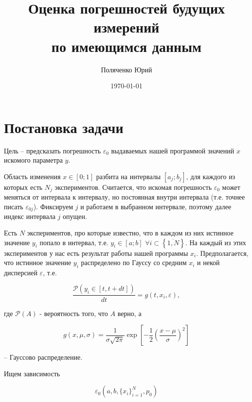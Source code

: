 \documentclass[a4paper,12pt]{article} %
\author{Поляченко Юрий}
\title{Оценка погрешностей будущих измерений \\ по имеющимся данным}
\date{\today}
\begin{document}

\clearpage\maketitle
\thispagestyle{empty}

\newpage

\tableofcontents

\newpage

\section{Постановка задачи}

Цель -- предсказать погрешность $\varepsilon_0$ выдаваемых нашей программой значений $x$ искомого параметра $y$.

Область изменения $x \in [0;1]$ разбита на интервалы $[a_j; b_j]$, для каждого из которых есть $N_j$ экспериментов. Считается, что искомая погрешность $\varepsilon_0$ может меняться от интервала к интервалу, но постоянная внутри интервала (т.е. точнее писать $\varepsilon_{0j}$). Фиксируем $j$ и работаем в выбранном интервале, поэтому далее индекс интервала $j$ опущен.

Есть $N$ экспериментов, про которые известно, что в каждом из них истинное значение $y_i$ попало в интервал, т.е. $y_i \in [a;b]$ $\forall i \subset \left\{\overline{1,N}\right\}$. На каждый из этих экспериментов у нас есть результат работы нашей программы $x_i$. Предполагается, что истинное значение $y_{i}$ распределено по Гауссу со средним $x_i$ и некой дисперсией $\varepsilon$, т.е.

\begin{equation}
\dfrac{\mathcal{P}(y_i \in [t, t+dt])}{dt} = g(t, x_i, \varepsilon), 
\end{equation}

где $\mathcal{P}(A)$ - вероятность того, что $A$ верно, а

\begin{equation}
g(x, \mu, \sigma) = \dfrac{1}{\sigma \sqrt{2 \pi}} \exp{\left[ - \dfrac{1}{2} \left( \dfrac{x - \mu}{\sigma} \right)^2 \right]}
\end{equation}

-- Гауссово распределение.

Ищем зависимость

\begin{equation}
\varepsilon_0 \left( a, b, \{x_i\}_{i = 1}^{N}, p_0 \right)
\end{equation}
\end{document}
